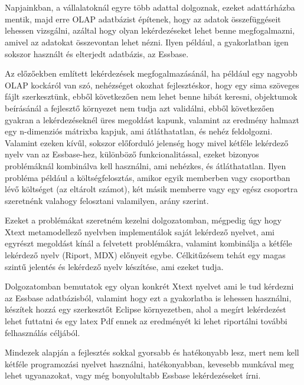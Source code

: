\chapter*{\bevezeto}
Napjainkban, a vállalatoknál egyre több adattal dolgoznak, ezeket adattárházba mentik, 
majd erre OLAP adatbázist építenek, hogy az adatok összefüggéseit lehessen vizsgálni, 
azáltal hogy olyan lekérdezéseket lehet benne megfogalmazni, amivel az adatokat összevontan lehet nézni. 
Ilyen például, a gyakorlatban igen sokszor használt és elterjedt adatbázis, az Essbase.

Az előzőekben említett lekérdezések megfogalmazásánál, ha például egy nagyobb OLAP kockáról van szó, 
nehézséget okozhat fejlesztéskor, hogy egy sima szöveges fájlt szerkesztünk, 
ebből következően nem lehet benne hibát keresni, objektumok beírásánál a
fejlesztő környezet nem tudja azt validálni, ebből következően gyakran a
lekérdezéseknél üres megoldást kapunk, valamint az eredmény halmazt egy
n-dimenziós mátrixba kapjuk, ami átláthatatlan, és nehéz feldolgozni. Valamint
ezeken kívűl, sokszor előforduló jelenség hogy mivel kétféle lekérdező nyelv van
az Essbase-hez, különböző funkcionalitással, ezeket bizonyos problémáknál
kombinálva kell használni, ami nehézkes, és átláthatatlan. Ilyen probléma
például a költségfelosztás, amikor egyik memberben vagy csoportban lévő
költséget (az eltárolt számot), két másik memberre vagy egy egész csoportra
szeretnénk valahogy felosztani valamilyen, arány szerint.

Ezeket a problémákat szeretném kezelni dolgozatomban, mégpedig úgy hogy Xtext
metamodellező nyelvben implementálok saját lekérdező nyelvet, ami egyrészt
megoldást kínál a felvetett problémákra, valamint kombinálja a kétféle lekérdező
nyelv (Riport, MDX) előnyeit egybe. Célkitűzésem tehát egy magas szintű jelentés
és lekérdező nyelv készítése, ami ezeket tudja.

Dolgozatomban bemutatok egy olyan konkrét Xtext nyelvet ami le tud kérdezni az
Essbase adatbázisból, valamint hogy ezt a gyakorlatba is lehessen használni,
készítek hozzá egy szerkesztőt Eclipse környezetben, ahol a megírt lekérdezést
lehet futtatni és egy latex Pdf ennek az eredményét ki lehet riportálni további
felhasználás céljából.

Mindezek alapján a fejlesztés sokkal gyorsabb és hatékonyabb lesz, mert nem kell
kétféle programozási nyelvet használni, hatékonyabban, kevesebb munkával meg
lehet ugyanazokat, vagy még bonyolultabb Essbase lekérdezéseket írni.


 
